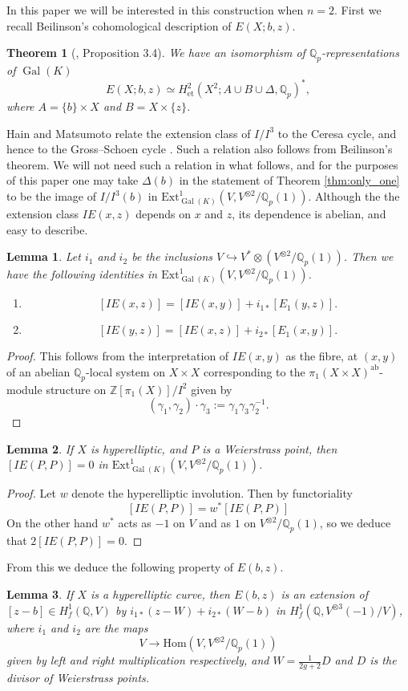 \documentclass[11pt]{amsart}
\def\Z{\mathbb Z}
\def\Q{\mathbb Q}
\newcommand{\Ext}{\mathrm{Ext}}
\theoremstyle{plain}
\newtheorem{theorem}{Theorem}
\newtheorem{lemma}{Lemma}
\theoremstyle{definition}
\DeclareMathOperator{\ab}{ab}
\DeclareMathOperator{\Gal}{Gal}
\newcommand{\Hom}{\mathrm{Hom}}
\newcommand{\et}{\mathrm{et}}
\begin{document}
In this paper we will be interested in this construction when $n=2$. First we recall Beilinson's cohomological description of $E(X;b,z)$.
\begin{theorem}[\cite{DG}, Proposition 3.4]
We have an isomorphism of $\Q _p$-representations of $\Gal (K)$
\[
E(X;b,z)\simeq H^2 _{\et }(X^2 ;A\cup B\cup \Delta ,\Q _p )^* ,
\]
where $A=\{ b\} \times X$ and $B=X\times \{ z\}$.
\end{theorem}
Hain and Matsumoto \cite[Theorem 3]{HM} relate the extension class of $I/I^3 $ to the Ceresa cycle, and hence to the Gross--Schoen cycle \cite{GS}. Such a relation also follows from Beilinson's theorem. We will not need such a relation in what follows, and for the purposes of this paper one may take $\Delta (b)$ in the statement of Theorem \ref{thm:only_one} to be the image of $I/I^3 (b)$ in $\Ext ^1 _{\Gal (K)}(V,V^{\otimes 2}/\Q _p (1))$.
Although the the extension class $IE(x,z)$ depends on $x$ and $z$, its dependence is abelian, and easy to describe.
\begin{lemma}\label{lemma:IE}
Let $i_1 $ and $i_2$ be the inclusions $V\hookrightarrow V^* \otimes (V^{\otimes 2}/\Q _p (1))$. Then we have the following identities in $\Ext ^1 _{\Gal (K)}(V,V^{\otimes 2}/\Q _p (1))$.
\begin{enumerate}
\item 
\[
[IE(x,z)]=[IE(x,y)]+i_{1*}[E_1 (y,z)].
\]
\item
\[
[IE(y,z)]=[IE(x,z)]+i_{2*}[E_1 (x,y)].
\]
\end{enumerate}
\end{lemma}
\begin{proof}
This follows from the interpretation of $IE(x,y)$ as the fibre, at $(x,y)$ of an abelian $\Q _p$-local system on $X\times X$ corresponding to the $\pi _1 (X\times X)^{\ab}$-module structure on $\Z [\pi _1 (X)]/I^2 $ given by 
\[
(\gamma _1 ,\gamma _2 )\cdot \gamma _3 :=\gamma _1 \gamma _3 \gamma _2 ^{-1}.
\]
\end{proof}

\begin{lemma}
If $X$ is hyperelliptic, and $P$ is a Weierstrass point, then $[IE(P,P)]=0$ in $\Ext ^1 _{\Gal (K)}(V,V^{\otimes 2}/\Q _p (1))$.
\end{lemma}
\begin{proof}
Let $w$ denote the hyperelliptic involution. Then by functoriality
\[
[IE(P,P)]=w^* [IE(P,P)]
\]
On the other hand $w^*$ acts as $-1$ on $V$ and as $1$ on $V^{\otimes 2}/\Q _p (1)$, so we deduce that $2[IE(P,P)]=0$.
\end{proof}
From this we deduce the following property of $E(b,z)$.
\begin{lemma}
If $X$ is a hyperelliptic curve, then $E(b,z)$ is an extension of $[z-b]\in H^1 _f (\Q ,V)$ by $i_{1*} (z-W)+i_{2*}  (W-b)$ in $H^1 _f (\Q ,V^{\otimes 3}(-1)/V)$, where $i_1$ and $i_2 $ are the maps
\[
V\to \Hom (V,V^{\otimes 2}/\Q _p (1))
\]
given by left and right multiplication respectively, and $W=\frac{1}{2g+2}D$ and $D$ is the divisor of Weierstrass points.
\end{lemma}
\end{document}
